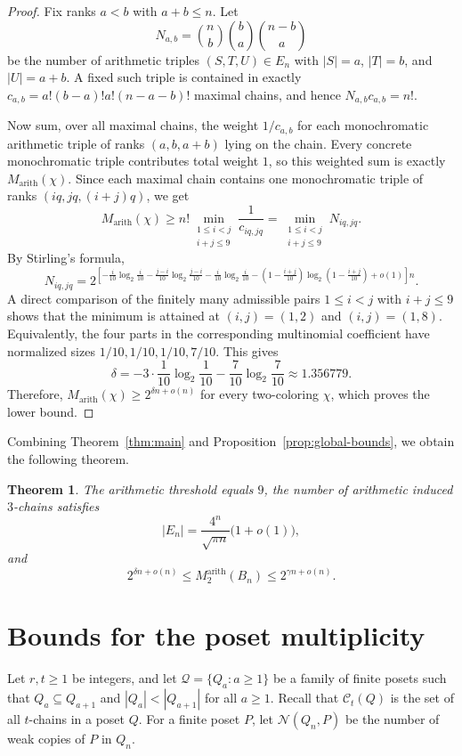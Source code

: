 \documentclass[twoside,12pt]{article}
\newtheorem{theorem}{Theorem}[section]
\begin{document}
\begin{proof}
Fix ranks \(a<b\) with \(a+b\leq n\). Let
\[
N_{a,b}=\binom{n}{b}\binom ba\binom{n-b}{a}
\]
be the number of arithmetic triples \((S,T,U)\in E_n\) with
\(|S|=a\), \(|T|=b\), and \(|U|=a+b\). A fixed such triple is contained in
exactly
$c_{a,b}=a!(b-a)!a!(n-a-b)!$
maximal chains, and hence
$N_{a,b}c_{a,b}=n!$.

Now sum, over all maximal chains, the weight \(1/c_{a,b}\) for each
monochromatic arithmetic triple of ranks \((a,b,a+b)\) lying on the chain.
Every concrete monochromatic triple contributes total weight \(1\), so this
weighted sum is exactly \(M_{\mathrm{arith}}(\chi)\). Since each maximal chain
contains one monochromatic triple of ranks \((iq,jq,(i+j)q)\), we get
\[
M_{\mathrm{arith}}(\chi)
\geq
n!\min_{\substack{1\leq i<j\\ i+j\leq9}}\frac1{c_{iq,jq}}
=
\min_{\substack{1\leq i<j\\ i+j\leq9}}N_{iq,jq}.
\]
By Stirling's formula,
\[
N_{iq,jq}
=
2^{\left[
-\frac{i}{10}\log_2\frac{i}{10}
-\frac{j-i}{10}\log_2\frac{j-i}{10}
-\frac{i}{10}\log_2\frac{i}{10}
-\left(1-\frac{i+j}{10}\right)\log_2\left(1-\frac{i+j}{10}\right)
+o(1)\right]n}.
\]
A direct comparison of the finitely many admissible pairs \(1\leq i<j\) with
\(i+j\leq9\) shows that the minimum is attained at
\((i,j)=(1,2)\) and \((i,j)=(1,8)\). Equivalently, the four parts in the corresponding multinomial coefficient have normalized sizes \(1/10,1/10,1/10,7/10\). This gives
\[
\delta=
-3\cdot\frac1{10}\log_2\frac1{10}
-\frac7{10}\log_2\frac7{10}
\approx 1.356779.
\]
Therefore, \(M_{\mathrm{arith}}(\chi)\geq2^{\delta n+o(n)}\) for every
two-coloring \(\chi\), which proves the lower bound.
\end{proof}
Combining Theorem~\ref{thm:main} and Proposition~\ref{prop:global-bounds}, we obtain the following theorem.
\begin{theorem}\label{thm:arith-main-section}
The arithmetic threshold equals $9$, the number of arithmetic induced $3$-chains satisfies
\[
|E_n|=\frac{4^n}{\sqrt{\pi n}}\bigl(1+o(1)\bigr),
\]
and
\[
2^{\delta n+o(n)}
\leq M^{\mathrm{arith}}_2(B_n)
\leq 2^{\gamma n+o(n)}.
\]
\end{theorem}

\section{Bounds for the poset multiplicity}\label{sec_3}

Let $r,t\geq1$ be integers, and let $\mathcal Q=\{Q_a:a\geq1\}$ be a family of finite posets such that $Q_a\subseteq Q_{a+1}$ and $|Q_a|<|Q_{a+1}|$ for all $a\geq1$. Recall that $\mathcal C_t(Q)$ is the set of all $t$-chains in a poset $Q$. For a finite poset $P$, let $\mathcal N(Q_n,P)$ be the number of weak copies of $P$ in $Q_n$.
\end{document}
